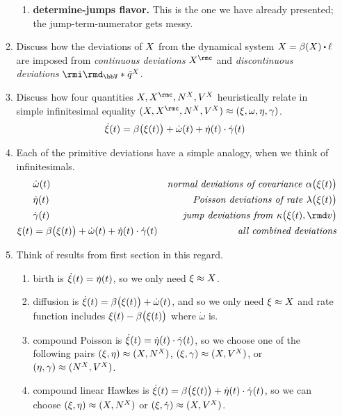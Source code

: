 \begin{enumerate}
\begin{enumerate}
\begin{enumerate}
          \item
            \textbf{determine-jumps flavor.}
            This is the one we have already presented; the jump-term-numerator gets messy.
        \end{enumerate}
      \item
        Discuss how the deviations of $X$ from the dynamical system $\X = \affDrift(\X) \shortInt \leb$ are imposed from \emph{continuous deviations} $\X^\rmc$ and \emph{discontinuous deviations} $\id_\vecSpace \ast \compensate{\jumpMeas^\X}$.
      \item
        Discuss how four quantities $\X, \X^\rmc, \N^\X, V^\X$ heuristically relate in simple infinitesimal equality $(\X, \X^\rmc, \N^\X, V^\X) \approx (\pathVar, \omega, \eta, \gamma)$.
        \begin{align*}
          \dot{\xi}(t) = \beta\big(\xi(t)\big) + \dot\omega(t) + \dot\eta(t) \cdot \dot\gamma(t)
        \end{align*}
      \item
        Each of the primitive deviations have a simple analogy, when we think of infinitesimals.
        \begin{align*}
          &\dot\omega(t)  & \text{\emph{normal deviations of covariance }} \affDiff\big(\pathVar(t)\big) \\
          &\dot\eta(t) & \text{\emph{Poisson deviations of rate }} \affInt\big(\pathVar(t)\big) \\
          &\dot\gamma(t) & \text{\emph{jump deviations from }} \affDist\big(\pathVar(t), \rmd\markVar\big) \\
          \pathVar(t) &=\affDrift\big(\pathVar(t)\big) + \dot\omega(t) + \dot\eta(t)\cdot\dot\gamma(t) & \text{\emph{all combined deviations}}
        \end{align*}
      \item
        Think of results from first section in this regard.
        \begin{enumerate}
          \item
            birth is  $\dot{\xi}(t) = \dot\eta(t)$, so we only need $\xi \approx X$.
          \item
            diffusion is $\dot{\xi}(t) = \beta\big(\xi(t)\big) + \dot\omega(t)$, and so we only need $\xi\approx X$ and rate function includes $\xi(t) - \beta\big(\xi(t)\big)$ where $\dot\omega$ is.
          \item
            compound Poisson is $\dot{\xi}(t) = \dot\eta(t) \cdot \dot\gamma(t)$, so we choose one of the following pairs $(\xi, \eta) \approx (X, N^X)$, $(\xi, \gamma) \approx (X, V^X)$, or $(\eta, \gamma) \approx (N^X, V^X)$.
          \item
            compound linear Hawkes is $\dot{\xi}(t) = \beta\big(\xi(t)\big) + \dot\eta(t) \cdot \dot\gamma(t)$, so we can choose $(\xi, \eta) \approx (X, N^X)$ or $(\xi, \dot\gamma) \approx (X, V^X)$.
        \end{enumerate}
    \end{enumerate}
\end{enumerate}
